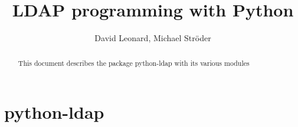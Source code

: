 \documentclass{manual}
\title{LDAP programming with Python}
\author{David Leonard, Michael Str\"oder}
\begin{document}
\maketitle

\begin{abstract}
\noindent
This document describes the package python-ldap with its various modules
\end{abstract}

\tableofcontents

\chapter{ python-ldap }








\renewcommand{\indexname}{Index}
\end{document}
